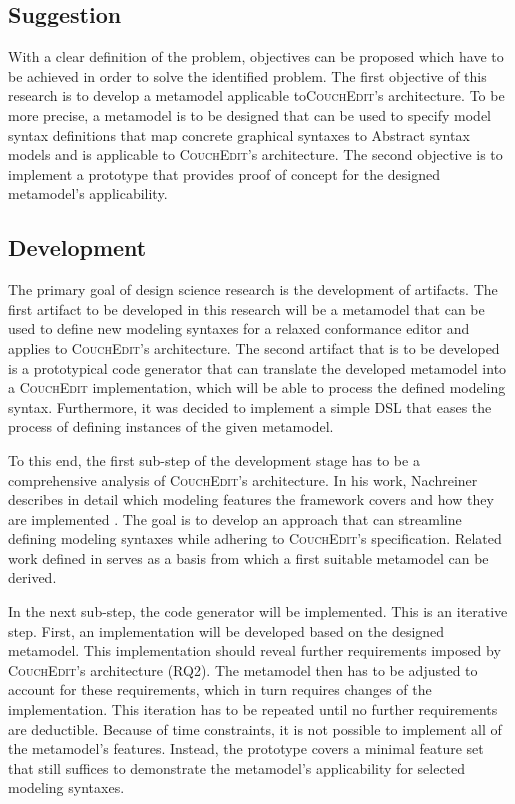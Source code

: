 \subsection{Suggestion}
With a clear definition of the problem, objectives can be proposed which have to be achieved in order to solve the identified problem. The first objective of this research is to develop a metamodel applicable to\textsc{CouchEdit}'s architecture. To be more precise, a metamodel is to be designed that can be used to specify model syntax definitions that map concrete graphical syntaxes to Abstract syntax models and is applicable to \textsc{CouchEdit}'s architecture. The second objective is to implement a prototype that provides proof of concept for the designed metamodel's applicability.


\subsection{Development}
The primary goal of design science research is the development of artifacts.
The first artifact to be developed in this research will be a metamodel that can be used to define new modeling syntaxes for a relaxed conformance editor and applies to \textsc{CouchEdit}'s architecture. The second artifact that is to be developed is a prototypical code generator that can translate the developed metamodel into a \textsc{CouchEdit} implementation, which will be able to process the defined modeling syntax. Furthermore, it was decided to implement a simple DSL that eases the process of defining instances of the given metamodel.

To this end, the first sub-step of the development stage has to be a comprehensive analysis of \textsc{CouchEdit}'s architecture. In his work, Nachreiner describes in detail which modeling features the framework covers and how they are implemented \cite{nachreiner_couchedit_2020}. The goal is to develop an approach that can streamline defining modeling syntaxes while adhering to \textsc{CouchEdit}'s specification. Related work defined in  serves as a basis from which a first suitable metamodel can be derived.

In the next sub-step, the code generator will be implemented. This is an iterative step. First, an implementation will be developed based on the designed metamodel. This implementation should reveal further requirements imposed by \textsc{CouchEdit}'s architecture (RQ2). The metamodel then has to be adjusted to account for these requirements, which in turn requires changes of the implementation. This iteration has to be repeated until no further requirements are deductible. Because of time constraints, it is not possible to implement all of the metamodel's features. Instead, the prototype covers a minimal feature set that still suffices to demonstrate the metamodel's applicability for selected modeling syntaxes.

